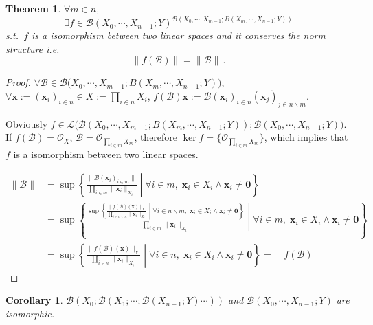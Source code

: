 \documentclass[openany]{book}
\theoremstyle{plain}
\newtheorem{theorem}{Theorem}[section] %
\newtheorem{corollary}{Corollary} %
\theoremstyle{definition}
\newcommand*{\bv}{\boldsymbol} %
\begin{document}
\begin{theorem}
	$\forall m \in n$, 
	\begin{equation*}
		\exists f \in \mathcal B(X_0, \cdots, X_{n-1}; Y)^{\mathcal B (X_0, \cdots, X_{m-1}; B(X_m, \cdots, X_{n-1}; Y))}
	\end{equation*}
	s.t.\ $f$ is a isomorphism between two linear spaces and it conserves the norm structure i.e.\ 
	\begin{equation*}
		\|f(\mathscr B)\| = \|\mathscr B\|\,.
	\end{equation*}
\end{theorem}
\begin{proof}
	$\forall \mathscr B \in \mathcal B \big(X_0, \cdots, X_{m-1}; B(X_m, \cdots, X_{n-1}; Y)\big)$, $\forall \bv x := (\bv x_i)_{i \in n} \in X := \prod_{i \in n} X_i$, $f(\mathscr B) \bv x := \mathscr B(\bv x_i)_{i \in n} (\bv x_j)_{j \in n \backslash m}$.

	Obviously $f \in \mathcal L\big(\mathcal B (X_0, \cdots, X_{m-1}; B(X_m, \cdots, X_{n-1}; Y)); \mathcal B(X_0, \cdots, X_{n-1}; Y)\big)$. 
	If $f(\mathscr B) = \mathscr O_X$, $\mathscr B = \mathscr O_{\prod_{i \in m} X_m}$, therefore $\ker f = \{\mathscr O_{\prod_{i \in m} X_m}\}$, which implies that $f$ is a isomorphism between two linear spaces.

	\begin{align*}
		\|\mathscr B\| &= \sup 
		\left\{ 
			\frac{\|\mathscr B(\bv x_i)_{i \in m}\|}{\prod_{i \in m} \|\bv x_i\|_{X_i}}
		\middle|
			\forall i \in m,\; \bv x_i \in X_i \wedge \bv x_i \neq \bv 0
		\right\}
		\\
		&= \sup 
		\left\{ 
			\frac{\sup \left\{ 
				\frac{\|f(\mathscr B)(\bv x)\|_Y}{\prod_{i \in n \backslash m} \|\bv x_i\|_{X_i}}
			\middle|
				\forall i \in n \backslash m,\; \bv x_i \in X_i \wedge \bv x_i \neq \bv 0
			\right\}}{\prod_{i \in m} \|\bv x_i\|_{X_i}}
		\middle|
			\forall i \in m,\; \bv x_i \in X_i \wedge \bv x_i \neq \bv 0
		\right\}
		\\
		&=
		\sup \left\{ 
				\frac{\|f(\mathscr B)(\bv x)\|_Y}{\prod_{i \in n} \|\bv x_i\|_{X_i}}
				\middle|
				\forall i \in n,\; \bv x_i \in X_i \wedge \bv x_i \neq \bv 0
			\right\}
		= \|f(\mathscr B)\|
	\end{align*}
\end{proof}

\begin{corollary}
	$\mathcal B(X_0; \mathcal B(X_1; \cdots; \mathcal B(X_{n-1}; Y) \cdots ))$  and $\mathcal B(X_0, \cdots, X_{n-1}; Y)$ are isomorphic.
\end{corollary}
\end{document}
